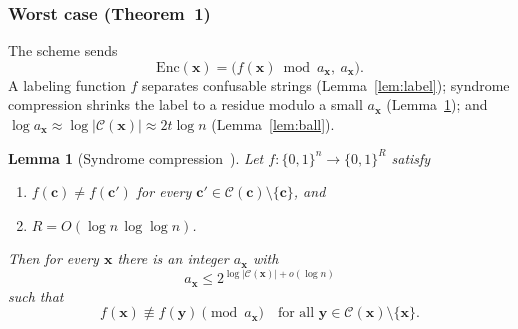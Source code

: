\documentclass[journal,10pt]{IEEEtran}
\newtheorem{lemma}{Lemma}
\newcommand{\Enc}{\mathrm{Enc}}
\newcommand{\C}{\mathcal{C}}
\newcommand{\bx}{\mathbf{x}}
\newcommand{\by}{\mathbf{y}}
\begin{document}
\subsubsection{Worst case (Theorem~1)}\label{sec:theory}
The scheme sends
\[
\Enc(\bx)=\bigl(f(\bx)\bmod a_{\bx},\ a_{\bx}\bigr).
\]
A labeling function $f$ separates confusable strings (Lemma~\ref{lem:label}); syndrome compression shrinks the label to a residue modulo a small $a_{\bx}$ (Lemma~\ref{lem:sc}); and $\log a_{\bx}\approx\log|\C(\bx)|\approx 2t\log n$ (Lemma~\ref{lem:ball}).

\begin{lemma}[Syndrome compression~\cite{sima_sc}]\label{lem:sc}
Let $f:\{0,1\}^n\to\{0,1\}^R$ satisfy
\begin{enumerate}
\item[(1)] $f(\mathbf c)\neq f(\mathbf c')$ for every $\mathbf c'\in\C(\mathbf c)\setminus\{\mathbf c\}$, and
\item[(2)] $R=O(\log n\,\log\log n)$.
\end{enumerate}
Then for every $\bx$ there is an integer $a_{\bx}$ with
\[
a_{\bx}\le 2^{\log|\C(\bx)|+o(\log n)}
\]
such that
\[
f(\bx)\not\equiv f(\by)\pmod{a_{\bx}}\quad\text{for all }\by\in\C(\bx)\setminus\{\bx\}.
\]
\end{lemma}
\end{document}
